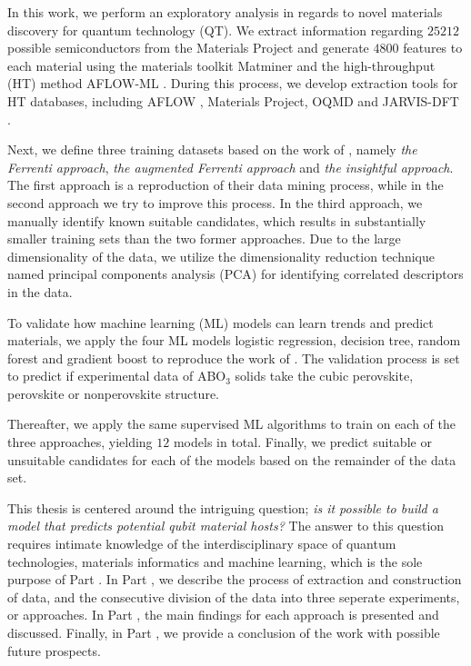 In this work, we perform an exploratory analysis in regards to novel materials discovery for quantum technology (QT). We extract information regarding $25212$ possible semiconductors from the Materials Project \cite{Jain2013, Jain2018} and generate $4800$ features to each material using the materials toolkit Matminer \cite{Ward2018} and the high-throughput (HT) method AFLOW-ML \cite{Isayev2017}.
During this process, we develop extraction tools for HT databases, including AFLOW \cite{Curtarolo2012, Curtarolo2012a, Calderon2015}, Materials Project, OQMD \cite{Saal2013, Kirklin2015} and JARVIS-DFT \cite{Choudhary2020}.

Next, we define three training datasets based on the work of \citeauthor{Ferrenti2020} \cite{Ferrenti2020}, namely \textit{the Ferrenti approach}, \textit{the augmented Ferrenti approach} and \textit{the insightful approach}. The first approach is a reproduction of their data mining process, while in the second approach we try to improve this process. In the third approach, we manually identify known suitable candidates, which results in substantially smaller training sets than the two former approaches. Due to the large dimensionality of the data, we utilize the dimensionality reduction technique named principal components analysis (PCA) for identifying correlated descriptors in the data.

To validate how machine learning (ML) models can learn trends and predict materials, we apply the four ML models logistic regression, decision tree, random forest and gradient boost to reproduce the work of \citeauthor{Balachandran2018} \cite{Balachandran2018}. The validation process is set to predict if experimental data of ABO$_3$ solids take the cubic perovskite, perovskite or nonperovskite structure.

Thereafter, we apply the same supervised ML algorithms to train on each of the three approaches, yielding $12$ models in total. Finally, we predict suitable or unsuitable candidates for each of the models based on the remainder of the data set.

This thesis is centered around the intriguing question; \textit{is it possible to build a model that predicts potential qubit material hosts?} The answer to this question requires intimate knowledge of the interdisciplinary space of quantum technologies, materials informatics and machine learning, which is the sole purpose of Part .
In Part , we describe the process of extraction and construction of data, and the consecutive division of the data into three seperate experiments, or approaches. In Part , the main findings for each approach is presented and discussed. Finally, in Part , we provide a conclusion of the work with possible future prospects.



